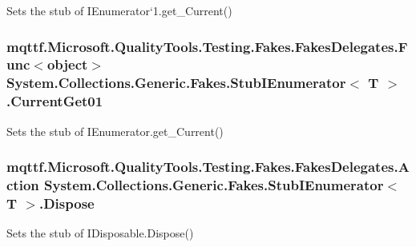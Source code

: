 Sets the stub of I\-Enumerator`1.get\-\_\-\-Current()

\hypertarget{class_system_1_1_collections_1_1_generic_1_1_fakes_1_1_stub_i_enumerator_3_01_t_01_4_a9508d682fabb1d2f92f1046446b0cc9a}{
\subsubsection[{Current\-Get01}]{\setlength{\rightskip}{0pt plus 5cm}mqttf.\-Microsoft.\-Quality\-Tools.\-Testing.\-Fakes.\-Fakes\-Delegates.\-Func$<$object$>$ System.\-Collections.\-Generic.\-Fakes.\-Stub\-I\-Enumerator$<$ T $>$.Current\-Get01}}\label{class_system_1_1_collections_1_1_generic_1_1_fakes_1_1_stub_i_enumerator_3_01_t_01_4_a9508d682fabb1d2f92f1046446b0cc9a}


Sets the stub of I\-Enumerator.\-get\-\_\-\-Current()

\hypertarget{class_system_1_1_collections_1_1_generic_1_1_fakes_1_1_stub_i_enumerator_3_01_t_01_4_ad7c033ddf1bae2981e789ce89fcde924}{
\subsubsection[{Dispose}]{\setlength{\rightskip}{0pt plus 5cm}mqttf.\-Microsoft.\-Quality\-Tools.\-Testing.\-Fakes.\-Fakes\-Delegates.\-Action System.\-Collections.\-Generic.\-Fakes.\-Stub\-I\-Enumerator$<$ T $>$.Dispose}}\label{class_system_1_1_collections_1_1_generic_1_1_fakes_1_1_stub_i_enumerator_3_01_t_01_4_ad7c033ddf1bae2981e789ce89fcde924}


Sets the stub of I\-Disposable.\-Dispose()

